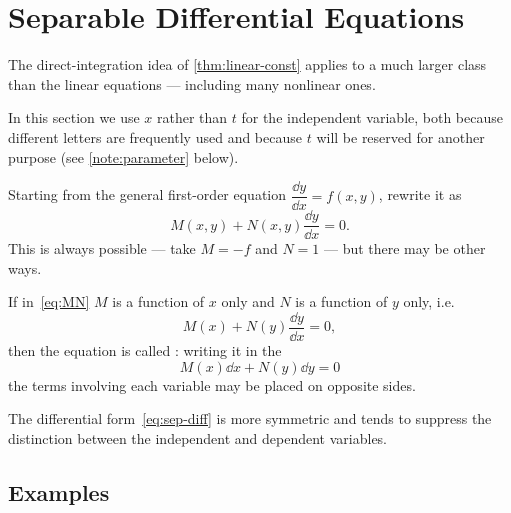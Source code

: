 
\section{Separable Differential Equations}\label{sec:separable}


The direct-integration idea of \autoref{thm:linear-const} applies to a much larger class
than the linear equations --- including many nonlinear ones.

\begin{notation}
	In this section we use \(x\) rather than \(t\) for the independent variable, both
	because different letters are frequently used and because \(t\) will be reserved for
	another purpose (see \autoref{note:parameter} below).
\end{notation}

Starting from the general first-order equation \(\dfrac{\dd y}{\dd x} = f(x,y)\), rewrite
it as
\begin{equation}\label{eq:MN}
	M(x,y) + N(x,y) \frac{\dd y}{\dd x} = 0.
\end{equation}
This is always possible --- take \(M = -f\) and \(N = 1\) --- but there may be other ways.

\begin{definition}
	If in~\eqref{eq:MN} \(M\) is a function of \(x\) only and \(N\) is a function of \(y\)
	only, i.e.
	\begin{equation}\label{eq:sep}
		M(x) + N(y) \frac{\dd y}{\dd x} = 0,
	\end{equation}
	then the equation is called : writing it in the 
	\begin{equation}\label{eq:sep-diff}
		M(x) \dd x + N(y) \dd y = 0
	\end{equation}
	the terms involving each variable may be placed on opposite sides.
\end{definition}

\begin{remark}
	The differential form~\eqref{eq:sep-diff} is more symmetric and tends to suppress the
	distinction between the independent and dependent variables.
\end{remark}

\subsection{Examples}

